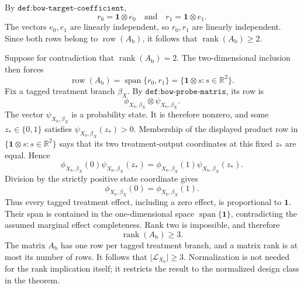 By \(\texttt{def:bow-target-coefficient}\),
\[
 r_0=\mathbf 1\otimes e_0
 \quad\text{and}\quad
 r_1=\mathbf 1\otimes e_1.
\]
The vectors \(e_0,e_1\) are linearly independent, so \(r_0,r_1\) are
linearly independent.  Since both rows belong to
\(\operatorname{row}(A_{\mathrm b})\), it follows that
\(\operatorname{rank}(A_{\mathrm b})\ge2\).

Suppose for contradiction that \(\operatorname{rank}(A_{\mathrm b})=2\).
The two-dimensional inclusion then forces
\[
 \operatorname{row}(A_{\mathrm b})
 =\operatorname{span}\{r_0,r_1\}
 =\{\mathbf 1\otimes s:s\in\mathbb R^2\}.
\]
Fix a tagged treatment branch \(\beta_X\).  By
\(\texttt{def:bow-probe-matrix}\), its row is
\[
 \phi_{X_{\mathrm b},\beta_X}\otimes
 \psi_{X_{\mathrm b},\beta_X}.
\]
The vector \(\psi_{X_{\mathrm b},\beta_X}\) is a probability state.  It is
therefore nonzero, and some \(z_*\in\{0,1\}\) satisfies
\(\psi_{X_{\mathrm b},\beta_X}(z_*)>0\).  Membership of the displayed
product row in \(\{\mathbf 1\otimes s:s\in\mathbb R^2\}\) says that its
two treatment-output coordinates at this fixed \(z_*\) are equal.  Hence
\[
 \phi_{X_{\mathrm b},\beta_X}(0)
 \psi_{X_{\mathrm b},\beta_X}(z_*)
 =
 \phi_{X_{\mathrm b},\beta_X}(1)
 \psi_{X_{\mathrm b},\beta_X}(z_*).
\]
Division by the strictly positive state coordinate gives
\[
 \phi_{X_{\mathrm b},\beta_X}(0)
 =\phi_{X_{\mathrm b},\beta_X}(1).
\]
Thus every tagged treatment effect, including a zero effect, is proportional
to \(\mathbf 1\).  Their span is contained in the one-dimensional space
\(\operatorname{span}\{\mathbf 1\}\), contradicting the assumed marginal
effect completeness.  Rank two is impossible, and therefore
\[
 \operatorname{rank}(A_{\mathrm b})\ge3.
\]
The matrix \(A_{\mathrm b}\) has one row per tagged treatment branch, and a
matrix rank is at most its number of rows.  It follows that
\(\lvert\mathcal L_{X_{\mathrm b}}\rvert\ge3\).  Normalization is not needed
for the rank implication itself; it restricts the result to the normalized
design class in the theorem.
